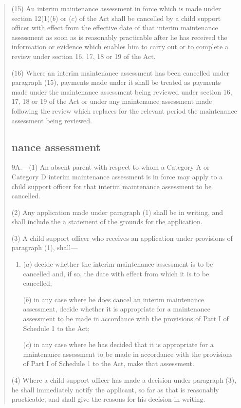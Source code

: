 \documentclass[a4paper]{article}
\begin{document}
\begin{quotation}
(15) An interim maintenance assessment in force which is made under section 12(1)($b$) or ($c$) of the Act shall be cancelled by a child support officer with effect from the effective date of that interim maintenance assessment as soon as is reasonably practicable after he has received the information or evidence which enables him to carry out or to complete a review under section 16, 17, 18 or 19 of the Act.

(16) Where an interim maintenance assessment has been cancelled under paragraph (15), payments made under it shall be treated as payments made under the maintenance assessment being reviewed under section 16, 17, 18 or 19 of the Act or under any maintenance assessment made following the review which replaces for the relevant period the maintenance assessment being reviewed.

\subsection*{\sloppy {}nance assessment}

9A.—(1) An absent parent with respect to whom a Category A or Category D interim maintenance assessment is in force may apply to a child support officer for that interim maintenance assessment to be cancelled.

(2) Any application made under paragraph (1) shall be in writing, and shall include the a statement of the grounds for the application.

(3) A child support officer who receives an application under provisions of paragraph (1), shall—
\begin{enumerate}\item[]
($a$) decide whether the interim maintenance assessment is to be cancelled and, if so, the date with effect from which it is to be cancelled;

($b$) in any case where he does cancel an interim maintenance assessment, decide whether it is appropriate for a maintenance assessment to be made in accordance with the provisions of Part I of Schedule 1 to the Act;

($c$) in any case where he has decided that it is appropriate for a maintenance assessment to be made in accordance with the provisions of Part I of Schedule 1 to the Act, make that assessment.
\end{enumerate}

(4) Where a child support officer has made a decision under paragraph (3), he shall immediately notify the applicant, so far as that is reasonably practicable, and shall give the reasons for his decision in writing.


\end{quotation}
\end{document}
